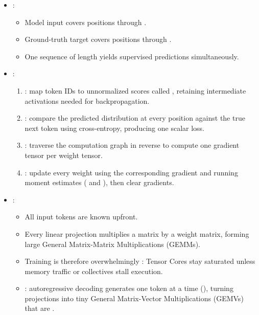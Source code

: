 \begin{itemize}
\begin{itemize}
    \end{itemize}
    \item {}:
    \begin{itemize}
        \item Model input  covers positions  through .
        \item Ground-truth target  covers positions  through .
        \item One sequence of length  yields  supervised predictions simultaneously.
    \end{itemize}
    \item {}:
    \begin{enumerate}
        \item {}: map \shape{[B, T]} token IDs to \shape{[B, T, V]} unnormalized scores called , retaining intermediate activations needed for backpropagation.
        \item {}: compare the predicted distribution at every position  against the true next token  using cross-entropy, producing one scalar loss.
        \item {}: traverse the computation graph in reverse to compute one gradient tensor per weight tensor.
        \item {}: update every weight using the corresponding gradient and running moment estimates ( and ), then clear gradients.
    \end{enumerate}
    \item {}:
    \begin{itemize}
        \item All  input tokens are known upfront.
        \item Every linear projection multiplies a \shape{[B*T, D\_in]} matrix by a \shape{[D\_in, D\_out]} weight matrix, forming large General Matrix-Matrix Multiplications (GEMMs).
        \item Training is therefore overwhelmingly : Tensor Cores stay saturated unless memory traffic or collectives stall execution.
        \item {}: autoregressive decoding generates one token at a time (), turning projections into tiny General Matrix-Vector Multiplications (GEMVs) that are .
    \end{itemize}
\end{itemize}

